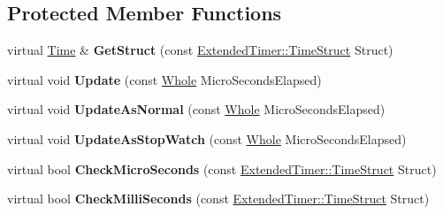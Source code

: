 \subsection*{Protected Member Functions}
\begin{DoxyCompactItemize}
\item 
\hypertarget{classphys_1_1ExtendedTimer_a94f3140d4eba930ed76cc530b4f847b7}{
virtual \hyperlink{structphys_1_1Time}{Time} \& {\bfseries GetStruct} (const \hyperlink{classphys_1_1ExtendedTimer_a0f316e9347d1c118a157cc3c737c554b}{ExtendedTimer::TimeStruct} Struct)}
\label{dc/d7c/classphys_1_1ExtendedTimer_a94f3140d4eba930ed76cc530b4f847b7}

\item 
\hypertarget{classphys_1_1ExtendedTimer_ac5e604ad911911939ba190520f8c3399}{
virtual void {\bfseries Update} (const \hyperlink{namespacephys_a460f6bc24c8dd347b05e0366ae34f34a}{Whole} MicroSecondsElapsed)}
\label{dc/d7c/classphys_1_1ExtendedTimer_ac5e604ad911911939ba190520f8c3399}

\item 
\hypertarget{classphys_1_1ExtendedTimer_af790c2d0fdaf009b77b8a351ab95026e}{
virtual void {\bfseries UpdateAsNormal} (const \hyperlink{namespacephys_a460f6bc24c8dd347b05e0366ae34f34a}{Whole} MicroSecondsElapsed)}
\label{dc/d7c/classphys_1_1ExtendedTimer_af790c2d0fdaf009b77b8a351ab95026e}

\item 
\hypertarget{classphys_1_1ExtendedTimer_a2df54619bf6a74d8c44c877352b3f323}{
virtual void {\bfseries UpdateAsStopWatch} (const \hyperlink{namespacephys_a460f6bc24c8dd347b05e0366ae34f34a}{Whole} MicroSecondsElapsed)}
\label{dc/d7c/classphys_1_1ExtendedTimer_a2df54619bf6a74d8c44c877352b3f323}

\item 
\hypertarget{classphys_1_1ExtendedTimer_a4ae8b42ab14c7eb0b667968362eb9fbc}{
virtual bool {\bfseries CheckMicroSeconds} (const \hyperlink{classphys_1_1ExtendedTimer_a0f316e9347d1c118a157cc3c737c554b}{ExtendedTimer::TimeStruct} Struct)}
\label{dc/d7c/classphys_1_1ExtendedTimer_a4ae8b42ab14c7eb0b667968362eb9fbc}

\item 
\hypertarget{classphys_1_1ExtendedTimer_ac70c02c75c9172a16dbd1dd3cdc1c554}{
virtual bool {\bfseries CheckMilliSeconds} (const \hyperlink{classphys_1_1ExtendedTimer_a0f316e9347d1c118a157cc3c737c554b}{ExtendedTimer::TimeStruct} Struct)}
\label{dc/d7c/classphys_1_1ExtendedTimer_ac70c02c75c9172a16dbd1dd3cdc1c554}


\end{DoxyCompactItemize}
